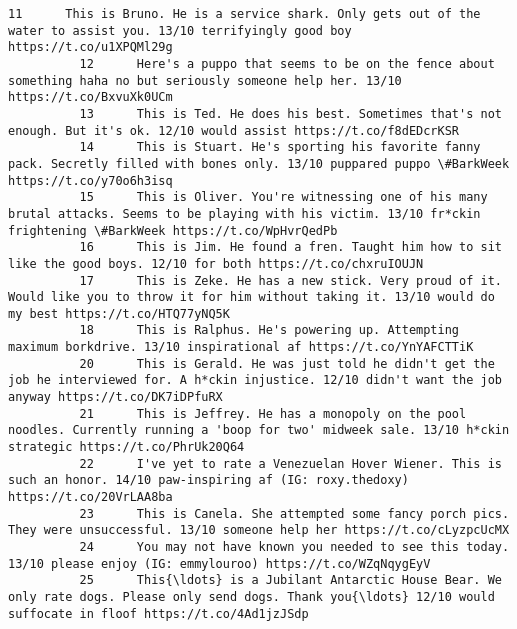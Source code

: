 \documentclass[11pt]{article}
\begin{document}
\begin{Verbatim}[commandchars=\\\{\}]
          11      This is Bruno. He is a service shark. Only gets out of the water to assist you. 13/10 terrifyingly good boy https://t.co/u1XPQMl29g                                   
          12      Here's a puppo that seems to be on the fence about something haha no but seriously someone help her. 13/10 https://t.co/BxvuXk0UCm                                    
          13      This is Ted. He does his best. Sometimes that's not enough. But it's ok. 12/10 would assist https://t.co/f8dEDcrKSR                                                   
          14      This is Stuart. He's sporting his favorite fanny pack. Secretly filled with bones only. 13/10 puppared puppo \#BarkWeek https://t.co/y70o6h3isq                        
          15      This is Oliver. You're witnessing one of his many brutal attacks. Seems to be playing with his victim. 13/10 fr*ckin frightening \#BarkWeek https://t.co/WpHvrQedPb    
          16      This is Jim. He found a fren. Taught him how to sit like the good boys. 12/10 for both https://t.co/chxruIOUJN                                                        
          17      This is Zeke. He has a new stick. Very proud of it. Would like you to throw it for him without taking it. 13/10 would do my best https://t.co/HTQ77yNQ5K              
          18      This is Ralphus. He's powering up. Attempting maximum borkdrive. 13/10 inspirational af https://t.co/YnYAFCTTiK                                                       
          20      This is Gerald. He was just told he didn't get the job he interviewed for. A h*ckin injustice. 12/10 didn't want the job anyway https://t.co/DK7iDPfuRX               
          21      This is Jeffrey. He has a monopoly on the pool noodles. Currently running a 'boop for two' midweek sale. 13/10 h*ckin strategic https://t.co/PhrUk20Q64               
          22      I've yet to rate a Venezuelan Hover Wiener. This is such an honor. 14/10 paw-inspiring af (IG: roxy.thedoxy) https://t.co/20VrLAA8ba                                  
          23      This is Canela. She attempted some fancy porch pics. They were unsuccessful. 13/10 someone help her https://t.co/cLyzpcUcMX                                           
          24      You may not have known you needed to see this today. 13/10 please enjoy (IG: emmylouroo) https://t.co/WZqNqygEyV                                                      
          25      This{\ldots} is a Jubilant Antarctic House Bear. We only rate dogs. Please only send dogs. Thank you{\ldots} 12/10 would suffocate in floof https://t.co/4Ad1jzJSdp             

\end{Verbatim}
\end{document}

